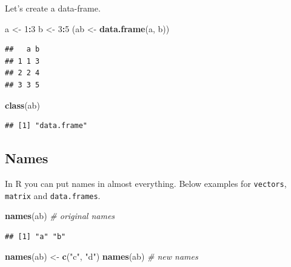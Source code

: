\documentclass[12pt,graybox,envcountchap,sectrefs]{krantz}
\makeatletter
\newenvironment{Shaded}{\begin{snugshade}}{\end{snugshade}}
\newcommand{\KeywordTok}[1]{\textcolor[rgb]{0.13,0.29,0.53}{\textbf{#1}}}
\newcommand{\DecValTok}[1]{\textcolor[rgb]{0.00,0.00,0.81}{#1}}
\newcommand{\StringTok}[1]{\textcolor[rgb]{0.31,0.60,0.02}{#1}}
\newcommand{\CommentTok}[1]{\textcolor[rgb]{0.56,0.35,0.01}{\textit{#1}}}
\newcommand{\OperatorTok}[1]{\textcolor[rgb]{0.81,0.36,0.00}{\textbf{#1}}}
\newcommand{\NormalTok}[1]{#1}
\newenvironment{kframe}{%
\medskip{}
\setlength{\fboxsep}{.8em}
 \def\at@end@of@kframe{}%
 \ifinner\ifhmode%
  \def\at@end@of@kframe{\end{minipage}}%
  \begin{minipage}{\columnwidth}%
 \fi\fi%
 \def\FrameCommand##1{\hskip\@totalleftmargin \hskip-\fboxsep
 \colorbox{shadecolor}{##1}\hskip-\fboxsep
     \hskip-\linewidth \hskip-\@totalleftmargin \hskip\columnwidth}%
 \MakeFramed {\advance\hsize-\width
   \@totalleftmargin\z@ \linewidth\hsize
   \@setminipage}}%
 {\par\unskip\endMakeFramed%
 \at@end@of@kframe}
\renewenvironment{Shaded}{\begin{kframe}}{\end{kframe}}
\theoremstyle{definition}
\theoremstyle{definition}
\theoremstyle{definition}
\theoremstyle{remark}
\makeatother
\begin{document}
Let's create a data-frame.

\begin{Shaded}
\begin{Highlighting}[]
\NormalTok{a <-}\StringTok{ }\DecValTok{1}\OperatorTok{:}\DecValTok{3}
\NormalTok{b <-}\StringTok{ }\DecValTok{3}\OperatorTok{:}\DecValTok{5}
\NormalTok{(ab <-}\StringTok{ }\KeywordTok{data.frame}\NormalTok{(a, b))}
\end{Highlighting}
\end{Shaded}

\begin{verbatim}
##   a b
## 1 1 3
## 2 2 4
## 3 3 5
\end{verbatim}

\begin{Shaded}
\begin{Highlighting}[]
\KeywordTok{class}\NormalTok{(ab)}
\end{Highlighting}
\end{Shaded}

\begin{verbatim}
## [1] "data.frame"
\end{verbatim}

\subsection{Names}\label{names}

In R you can put names in almost everything. Below examples for
\texttt{vectors}, \texttt{matrix} and \texttt{data.frames}.

\begin{Shaded}
\begin{Highlighting}[]
\KeywordTok{names}\NormalTok{(ab)                }\CommentTok{# original names}
\end{Highlighting}
\end{Shaded}

\begin{verbatim}
## [1] "a" "b"
\end{verbatim}

\begin{Shaded}
\begin{Highlighting}[]
\KeywordTok{names}\NormalTok{(ab) <-}\StringTok{ }\KeywordTok{c}\NormalTok{(}\StringTok{"c"}\NormalTok{, }\StringTok{"d"}\NormalTok{)}
\KeywordTok{names}\NormalTok{(ab)                }\CommentTok{# new names}
\end{Highlighting}
\end{Shaded}
\end{document}
